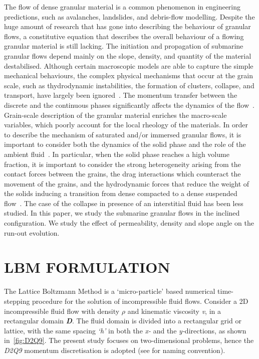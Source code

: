 \documentclass[12pt,a4paper,twocolumn,fleqn]{narms}
\begin{document}
The flow of dense granular material is a common phenomenon in engineering predictions, such as avalanches, landslides, and debris-flow modelling. Despite the huge amount of research that has gone into describing the behaviour of granular flows, a constitutive equation that describes the overall behaviour of a flowing granular material is still lacking. The initiation and propagation of submarine granular flows depend mainly on the slope, density, and quantity of the material destabilised. Although certain macroscopic models are able to capture the simple mechanical behaviours, the complex physical mechanisms that occur at the grain scale, such as thydrodynamic instabilities, the formation of clusters, collapse, and transport, have largely been ignored~. The momentum transfer between the discrete and the continuous phases significantly affects the dynamics of the flow~. Grain-scale description of the granular material enriches the macro-scale variables,  which poorly account for the local rheology of the materials.  In order to describe the mechanism of saturated and/or immersed granular flows, it is important to consider both the dynamics of the solid phase and the role of the ambient fluid~. In particular, when the solid phase reaches a high volume fraction, it is important to consider the strong heterogeneity arising from the contact forces between the grains, the drag interactions which counteract the movement of the grains, and the hydrodynamic forces that reduce the weight of the solids inducing a transition from dense compacted to a dense suspended flow~. The case of the collapse in presence of an interstitial fluid has been less studied. In this paper, we study the submarine granular flows in the inclined configuration. We study the effect of permeability, density and slope angle on the run-out evolution.
\section{LBM FORMULATION}

The Lattice Boltzmann Method is a `micro-particle' based numerical time-stepping procedure for the solution of incompressible fluid flows. Consider a 2D incompressible fluid flow with density $\rho$ and kinematic viscosity \textit{v}, in a rectangular domain \textit{\textbf{D}}. The fluid domain is divided into a rectangular grid or lattice, with the same spacing \textit{`h'} in both the \textit{x-} and the \textit{y-}directions, as shown in~\cref{fig:D2Q9}. The present study focuses on two-dimensional problems, hence the \textit{D2Q9} momentum discretisation is adopted (see  for naming convention).
\end{document}

